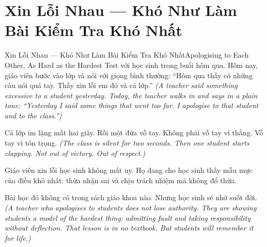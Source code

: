 \section{Xin Lỗi Nhau --- Khó Như Làm Bài Kiểm Tra Khó Nhất}
\begin{truyen}{Xin Lỗi Nhau --- Khó Như Làm Bài Kiểm Tra Khó Nhất}{Apologising to Each Other, As Hard as the Hardest Test}
 với học sinh trong buổi hôm qua. Hôm nay, giáo viên bước vào lớp và nói với giọng bình thường: ``Hôm qua thầy có những câu nói quá tay. Thầy xin lỗi em đó và cả lớp.''
\textit{(A teacher said something excessive to a student yesterday. Today, the teacher walks in and says in a plain tone: ``Yesterday I said some things that went too far. I apologise to that student and to the class.'')}

Cả lớp im lặng mất hai giây. Rồi một đứa vỗ tay. Không phải vỗ tay vì thắng. Vỗ tay vì tôn trọng.
\textit{(The class is silent for two seconds. Then one student starts clapping. Not out of victory. Out of respect.)}

\begin{baihoc}
Giáo viên xin lỗi học sinh không mất uy. Họ đang cho học sinh thấy mẫu mực của điều khó nhất: thừa nhận sai và chịu trách nhiệm mà không đổ thừa.

Bài học đó không có trong sách giáo khoa nào. Nhưng học sinh sẽ nhớ suốt đời.
\textit{(A teacher who apologises to students does not lose authority. They are showing students a model of the hardest thing: admitting fault and taking responsibility without deflection. That lesson is in no textbook. But students will remember it for life.)}
\end{baihoc}
\end{truyen}

